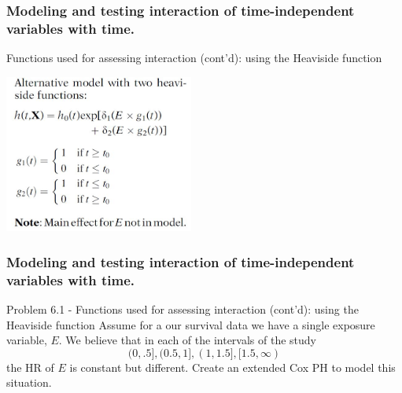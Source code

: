 \documentclass{beamer}
\theoremstyle{definition}
\begin{document}
\begin{frame}
\frametitle{Modeling and testing interaction of time-independent variables with time.}
\begin{block}{Functions used for assessing interaction (cont'd): using the Heaviside function}
\vspace{-20pt}
\begin{center}
\includegraphics[width =\textwidth, height=5.2cm]{CH6_HeSi3.JPG}
\end{center}
\end{block}
\end{frame}

\begin{frame}
\frametitle{Modeling and testing interaction of time-independent variables with time.}
\begin{block}{Problem 6.1 - Functions used for assessing interaction (cont'd): using the Heaviside function}
Assume for a our survival data we have a single exposure variable, $E$. We believe that in each of the intervals of the study
\[
(0,.5], (0.5,1], (1,1.5], [1.5,\infty)
\]
the HR of $E$ is constant but different. Create an extended Cox PH to model this situation.
\end{block}
\end{frame}
\end{document}
